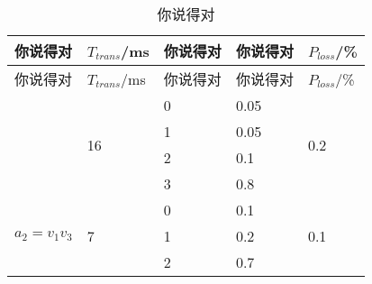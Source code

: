 \begin{longtable}[!ht]{lllll}
	\caption{你说得对}
	\label{config1-2}
		\hline
		你说得对                                                 & $T_{trans}$/ms      & 你说得对 & 你说得对 & $P_{loss}$/\%        \\ 
		\hline
		\endfirsthead
		\hline
		你说得对                                                 & $T_{trans}$/ms      & 你说得对 & 你说得对 & $P_{loss}$/\%        \\ 
		\hline
		\endhead
		
		\hline 
		\endfoot
		
		\multicolumn{1}{c}{\multirow{4}{*}{$a_1=v_1 v_2$}} & \multirow{4}{*}{16} & 0  & 0.05 & \multirow{4}{*}{0.2} \\
		\multicolumn{1}{c}{}                               &                     & 1  & 0.05 &                      \\
		\multicolumn{1}{c}{}                               &                     & 2  & 0.1  &                      \\
		\multicolumn{1}{c}{}                               &                     & 3  & 0.8  &                      \\ \hline
		\multirow{3}{*}{$a_2=v_1 v_3$}                     & \multirow{3}{*}{7}  & 0  & 0.1  & \multirow{3}{*}{0.1} \\
		&                     & 1  & 0.2  &                      \\
		&                     & 2  & 0.7  &                      \\ \hline
		

\end{longtable}
